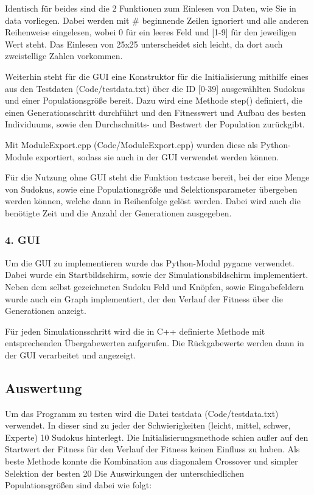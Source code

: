 \noindent Identisch für beides sind die 2 Funktionen zum Einlesen von Daten, wie Sie in data vorliegen. Dabei werden mit \# beginnende Zeilen ignoriert und alle anderen Reihenweise eingelesen, wobei 0 für ein leeres Feld und [1-9] für den jeweiligen Wert steht. Das Einlesen von 25x25 unterscheidet sich leicht, da dort auch zweistellige Zahlen vorkommen.

\noindent Weiterhin steht für die GUI eine Konstruktor für die Initialisierung mithilfe eines aus den Testdaten (Code/testdata.txt) über die ID [0-39] ausgewählten Sudokus und einer Populationsgröße bereit. 
Dazu wird eine Methode step() definiert, die einen Generationsschritt durchführt und den Fitnesswert und Aufbau des besten Individuums, sowie den Durchschnitts- und Bestwert der Population zurückgibt.

\noindent Mit ModuleExport.cpp (Code/ModuleExport.cpp) wurden diese als Python-Module exportiert, sodass sie auch in der GUI verwendet werden können.

\noindent Für die Nutzung ohne GUI steht die Funktion testcase bereit, bei der eine Menge von Sudokus, sowie eine Populationsgröße und Selektionsparameter übergeben werden können, welche dann in Reihenfolge gelöst werden. Dabei wird auch die benötigte Zeit und die Anzahl der Generationen ausgegeben.

\subsubsection*{4. GUI}

\noindent Um die GUI zu implementieren wurde das Python-Modul pygame verwendet. 
Dabei wurde ein Startbildschirm, sowie der Simulationsbildschirm implementiert. Neben dem selbst gezeichneten Sudoku Feld und Knöpfen, sowie Eingabefeldern wurde auch ein Graph implementiert, der den Verlauf der Fitness über die Generationen anzeigt.

\noindent Für jeden Simulationsschritt wird die in C++ definierte Methode
mit entsprechenden Übergabewerten aufgerufen. Die Rückgabewerte werden dann in der GUI verarbeitet und angezeigt.

\subsection*{Auswertung}
Um das Programm zu testen wird die Datei testdata (Code/testdata.txt) verwendet. In dieser sind zu jeder der Schwierigkeiten (leicht, mittel, schwer, Experte) 10 Sudokus hinterlegt. 
Die Initialisierungsmethode schien außer auf den Startwert der Fitness für den Verlauf der Fitness keinen Einfluss zu haben. 
Als beste Methode konnte die Kombination aus diagonalem Crossover und simpler Selektion der besten 20 %
Die Auswirkungen der unterschiedlichen Populationsgrößen sind dabei wie folgt:


